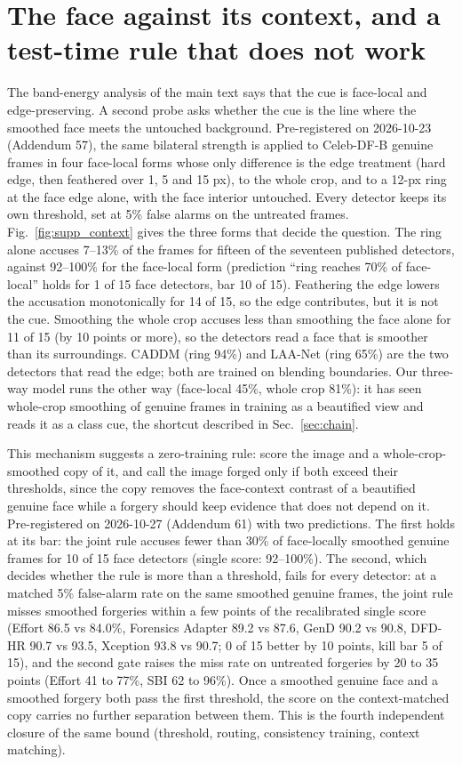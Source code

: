 \documentclass[10pt]{article}
\begin{document}
\section{The face against its context, and a test-time rule that does not work}
\label{sec:supp_context}
The band-energy analysis of the main text says that the cue is face-local and edge-preserving. A second probe asks whether the
cue is the line where the smoothed face meets the untouched background. Pre-registered on 2026-10-23 (Addendum 57), the same
bilateral strength is applied to Celeb-DF-B genuine frames in four face-local forms whose only difference is the edge treatment
(hard edge, then feathered over 1, 5 and 15 px), to the whole crop, and to a 12-px ring at the face edge alone, with the face
interior untouched. Every detector keeps its own threshold, set at 5\% false alarms on the untreated frames.
Fig.~\ref{fig:supp_context} gives the three forms that decide the question. The ring alone accuses 7--13\% of the frames for
fifteen of the seventeen published detectors, against 92--100\% for the face-local form (prediction ``ring reaches 70\% of
face-local'' holds for 1 of 15 face detectors, bar 10 of 15). Feathering the edge lowers the accusation monotonically for 14 of
15, so the edge contributes, but it is not the cue. Smoothing the whole crop accuses less than smoothing the face alone for 11 of
15 (by 10 points or more), so the detectors read a face that is smoother than its surroundings. CADDM (ring 94\%) and LAA-Net
(ring 65\%) are the two detectors that read the edge; both are trained on blending boundaries. Our three-way model runs the
other way (face-local 45\%, whole crop 81\%): it has seen whole-crop smoothing of genuine frames in training as a beautified
view and reads it as a class cue, the shortcut described in Sec.~\ref{sec:chain}.

This mechanism suggests a zero-training rule: score the image and a whole-crop-smoothed copy of it, and call the image forged
only if both exceed their thresholds, since the copy removes the face-context contrast of a beautified genuine face while a
forgery should keep evidence that does not depend on it. Pre-registered on 2026-10-27 (Addendum 61) with two predictions. The
first holds at its bar: the joint rule accuses fewer than 30\% of face-locally smoothed genuine frames for 10 of 15 face
detectors (single score: 92--100\%). The second, which decides whether the rule is more than a threshold, fails for every
detector: at a matched 5\% false-alarm rate on the same smoothed genuine frames, the joint rule misses smoothed forgeries within
a few points of the recalibrated single score (Effort 86.5 vs 84.0\%, Forensics Adapter 89.2 vs 87.6, GenD 90.2 vs 90.8, DFD-HR
90.7 vs 93.5, Xception 93.8 vs 90.7; 0 of 15 better by 10 points, kill bar 5 of 15), and the second gate raises the miss rate on
untreated forgeries by 20 to 35 points (Effort 41 to 77\%, SBI 62 to 96\%). Once a smoothed genuine face and a smoothed forgery
both pass the first threshold, the score on the context-matched copy carries no further separation between them. This is the
fourth independent closure of the same bound (threshold, routing, consistency training, context matching).
\end{document}
